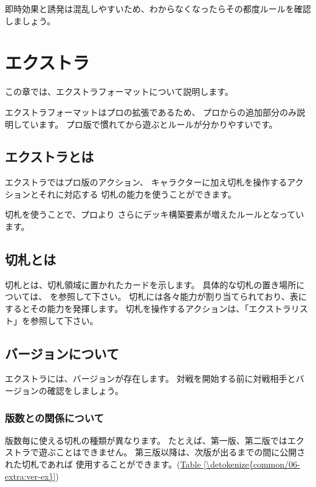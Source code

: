 \documentclass[letterpaper,10pt,dvipdfmx]{sphinxmanual}
\begin{document}
即時効果と誘発は混乱しやすいため、わからなくなったらその都度ルールを確認しましょう。


\section{エクストラ}
\label{\detokenize{common/06-extra:extra}}\label{\detokenize{common/06-extra:id1}}\label{\detokenize{common/06-extra::doc}}
この章では、エクストラフォーマットについて説明します。

エクストラフォーマットはプロの拡張であるため、
プロからの追加部分のみ説明しています。
プロ版で慣れてから遊ぶとルールが分かりやすいです。


\subsection{エクストラとは}
\label{\detokenize{common/06-extra:id2}}
エクストラではプロ版のアクション、
キャラクターに加え切札を操作するアクションとそれに対応する
切札の能力を使うことができます。

切札を使うことで、プロより
さらにデッキ構築要素が増えたルールとなっています。


\subsection{切札とは}
\label{\detokenize{common/06-extra:id3}}
切札とは、切札領域に置かれたカードを示します。
具体的な切札の置き場所については、 {\hyperref[\detokenize{common/01-base:field-ex}]{}} を参照して下さい。
切札には各々能力が割り当てられており、表にするとその能力を発揮します。
切札を操作するアクションは、「エクストラリスト」を参照して下さい。


\subsection{バージョンについて}
\label{\detokenize{common/06-extra:id4}}
エクストラには、バージョンが存在します。
対戦を開始する前に対戦相手とバージョンの確認をしましょう。


\subsubsection{版数との関係について}
\label{\detokenize{common/06-extra:id5}}
版数毎に使える切札の種類が異なります。
たとえば、第一版、第二版ではエクストラで遊ぶことはできません。
第三版以降は、次版が出るまでの間に公開された切札であれば
使用することができます。(\hyperref[\detokenize{common/06-extra:ver-ex}]{Table \ref{\detokenize{common/06-extra:ver-ex}}})
\end{document}
